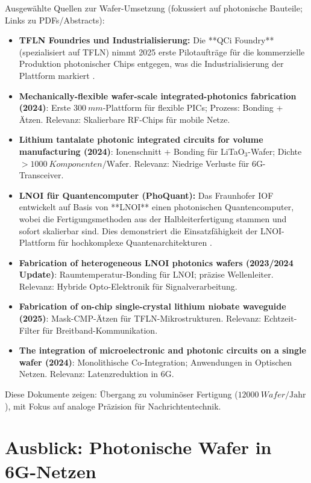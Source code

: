 	Ausgewählte Quellen zur Wafer-Umsetzung (fokussiert auf photonische Bauteile; Links zu PDFs/Abstracts):
	
	\begin{itemize}
		\item \textbf{TFLN Foundries und Industrialisierung:} Die **QCi Foundry** (spezialisiert auf TFLN) nimmt 2025 erste Pilotaufträge für die kommerzielle Produktion photonischer Chips entgegen, was die Industrialisierung der Plattform markiert \cite{tfln_foundry}.
		\item \textbf{Mechanically-flexible wafer-scale integrated-photonics fabrication (2024)}: Erste $\SI{300}{mm}$-Plattform für flexible PICs; Prozess: Bonding + Ätzen. Relevanz: Skalierbare RF-Chips für mobile Netze. \cite{flexible_wafer}
		\item \textbf{Lithium tantalate photonic integrated circuits for volume manufacturing (2024)}: Ionenschnitt + Bonding für LiTaO$_3$-Wafer; Dichte $>\SI{1000}{Komponenten}/\text{Wafer}$. Relevanz: Niedrige Verluste für 6G-Transceiver. \cite{lithium_tantalate}
		\item \textbf{LNOI für Quantencomputer (PhoQuant):} Das Fraunhofer IOF entwickelt auf Basis von **LNOI** einen photonischen Quantencomputer, wobei die Fertigungsmethoden aus der Halbleiterfertigung stammen und sofort skalierbar sind. Dies demonstriert die Einsatzfähigkeit der LNOI-Plattform für hochkomplexe Quantenarchitekturen \cite{phoquant}.
		\item \textbf{Fabrication of heterogeneous LNOI photonics wafers (2023/2024 Update)}: Raumtemperatur-Bonding für LNOI; präzise Wellenleiter. Relevanz: Hybride Opto-Elektronik für Signalverarbeitung. \cite{fabrication_heterogeneous}
		\item \textbf{Fabrication of on-chip single-crystal lithium niobate waveguide (2025)}: Mask-CMP-Ätzen für TFLN-Mikrostrukturen. Relevanz: Echtzeit-Filter für Breitband-Kommunikation. \cite{on_chip_lithium}
		\item \textbf{The integration of microelectronic and photonic circuits on a single wafer (2024)}: Monolithische Co-Integration; Anwendungen in Optischen Netzen. Relevanz: Latenzreduktion in 6G. \cite{integration_microelectronic}
	\end{itemize}
	
	Diese Dokumente zeigen: Übergang zu voluminöser Fertigung ($\SI{12000}{Wafer}/\text{Jahr}$), mit Fokus auf analoge Präzision für Nachrichtentechnik.
	
	\section{Ausblick: Photonische Wafer in 6G-Netzen}
	

